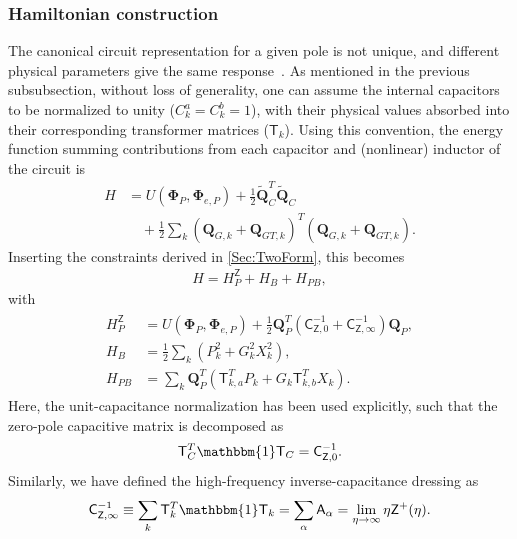 \documentclass[prx,aps,twocolumn,article]{revtex4-2}
\newcommand{\msf}[1]{\mathsf{#1}}
\newcommand{\bsb}[1]{\boldsymbol{#1}}
\newcommand{\bPhi}{\bsb{\Phi}}
\newcommand{\bQ}{\bsb{Q}}
\newcommand{\msT}{\msf{T}}
\newcommand{\msZ}{\msf{Z}}
\newcommand{\msC}{\msf{C}}
\newcommand{\msA}{\msf{A}}
\newcommand{\msId}{\mathbbm{1}}
\begin{document}
\subsubsection{Hamiltonian construction}
The canonical circuit representation for a given pole is not unique, and different physical parameters give the same response~\cite{Newcomb:1966}. As mentioned in the previous subsubsection, without loss of generality, one can assume the internal capacitors to be normalized to unity ($C_{k}^a=C_{k}^b=1$), with their physical values absorbed into their corresponding transformer matrices ($\msT_k$). Using this convention, the energy function summing contributions from each capacitor and (nonlinear) inductor of the circuit is     
\begin{align}
    H
    &=
    U(\bPhi_P,\bPhi_{e,P})
    +
    \frac{1}{2}
    \tilde{\bQ}_C^T
    \tilde{\bQ}_C
    \\
    &\quad+
    \frac{1}{2}
    \sum_k
    \left(
        \bQ_{G,k}
        +
        \bQ_{GT,k}
    \right)^T
    \left(
        \bQ_{G,k}
        +
        \bQ_{GT,k}
    \right).\nonumber
\end{align}
Inserting the constraints derived in \cref{Sec:TwoForm}, this becomes
\begin{align}
    H = H_P^\msZ + H_B + H_{PB},
    \label{Eq:FluxChargeHamiltonian}
\end{align}
with
\begin{align}
\begin{aligned}
    H_P^\msZ
    &=
    U(\bPhi_P,\bPhi_{e,P})
    +
    \frac{1}{2}
    \bQ_P^T
    \left(
        \msC_{\msZ,0}^{-1}
        +
        \msC_{\msZ,\infty}^{-1}
    \right)
    \bQ_P,
    \\
    H_B
    &=
    \frac{1}{2}
    \sum_k
    \left(
        P_k^2
        +
        G_k^2X_k^2
    \right),
    \\
    H_{PB}
    &=
    \sum_k
    \bQ_P^T
    \left(
        \msT_{k,a}^T P_k
        +
        G_k
        \msT_{k,b}^T X_k
    \right).
\end{aligned}
\label{Eq:DiscreteHamiltonian}
\end{align}
Here, the unit-capacitance normalization has been used explicitly, such that the zero-pole capacitive matrix is decomposed as
\begin{align}
    \msT_C^T\msId\msT_C
    =
    \msC_{\msZ,0}^{-1}.
\end{align}
Similarly, we have defined the high-frequency inverse-capacitance dressing as
\begin{align}
    \msC_{\msZ,\infty}^{-1}
    \equiv
    \sum_k
    \msT_k^T\msId\msT_k
    =
    \sum_\alpha
    \msA_\alpha
    =
    \lim_{\eta\rightarrow\infty}
    \eta\msZ^+(\eta).
    \label{Eq:ImpedanceHighFreqCapacitance}
\end{align}
\end{document}
